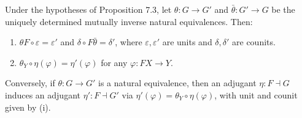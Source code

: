 Under the hypotheses of Proposition 7.3, let $\theta : G \to G'$ and $\bar{\theta} : G' \to G$ be the uniquely determined mutually inverse natural equivalences. Then:
\begin{enumerate}
\item[(i)] $\theta F \circ \varepsilon = \varepsilon'$ and $\delta \circ F\bar{\theta} = \delta'$, where $\varepsilon, \varepsilon'$ are units and $\delta, \delta'$ are counits.
\item[(ii)] $\theta_Y \circ \eta(\varphi) = \eta'(\varphi)$ for any $\varphi : FX \to Y$.
\end{enumerate}
Conversely, if $\theta : G \to G'$ is a natural equivalence, then an adjugant $\eta : F \dashv G$ induces an adjugant $\eta' : F \dashv G'$ via $\eta'(\varphi) = \theta_Y \circ \eta(\varphi)$, with unit and counit given by (i).
